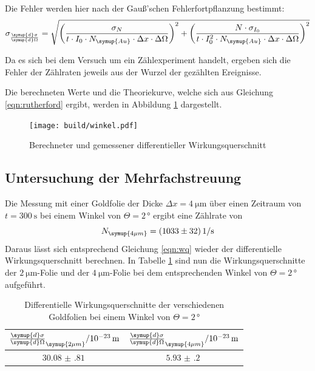 Die Fehler werden hier nach der Gauß'schen Fehlerfortpflanzung bestimmt:
\begin{equation*}
  \sigma_{\frac{\symup{d}\sigma}{\symup{d}\Omega}} = \sqrt{\left(\frac{\sigma_N}{t \cdot I_0 \cdot N_\symup{Au} \cdot \Delta x \cdot \Delta \Omega}\right)^2
  + \left(\frac{N \cdot \sigma_{I_0}}{t \cdot I_0^2 \cdot N_\symup{Au} \cdot \Delta x \cdot \Delta \Omega}\right)^2}
\end{equation*}

Da es sich bei dem Versuch um ein Zählexperiment handelt, ergeben sich die Fehler der Zählraten jeweils aus der Wurzel der gezählten Ereignisse.

Die berechneten Werte und die Theoriekurve, welche sich aus Gleichung \ref{eqn:rutherford} ergibt, werden in Abbildung \ref{fig:wirkungsquerschnitt} dargestellt.

\begin{figure}[H]
  \centering
  \texttt{[image: build/winkel.pdf]}
  \caption{Berechneter und gemessener differentieller Wirkungsquerschnitt}
  \label{fig:wirkungsquerschnitt}
\end{figure}


\subsection{Untersuchung der Mehrfachstreuung}
Die Messung mit einer Goldfolie der Dicke $\Delta x = \SI{4}{\micro\meter}$ über einen
Zeitraum von $t = \SI{300}{\second}$ bei einem Winkel von $\Theta = 2 \, °$ ergibt
eine Zählrate von
\begin{equation*}
  N_\symup{4\mu m} = \SI{1033(32)}{1\per\second}
\end{equation*}
Daraus lässt sich entsprechend Gleichung \ref{eqn:wq} wieder der differentielle Wirkungsquerschnitt
berechnen. In Tabelle \ref{tab:wq} sind nun die Wirkungsquerschnitte der $\SI{2}{\micro\meter}$-Folie
und der $\SI{4}{\micro\meter}$-Folie bei dem entsprechenden Winkel von $\Theta = 2 \, °$ aufgeführt.
\begin{table}[H]
  \centering
  \caption{Differentielle Wirkungsquerschnitte der verschiedenen Goldfolien bei einem Winkel von $\Theta = 2 \, °$}
  \label{tab:wq}
  \begin{tabular}{c c}
    \toprule
    $\frac{\symup{d}\sigma}{\symup{d}\Omega}_\symup{2\mu m} /  10^{-23}\, \mathrm{m}$ & $\frac{\symup{d}\sigma}{\symup{d}\Omega}_\symup{4\mu m}/ 10^{-23}\, \mathrm{m}$ \\
    \midrule
    $\SI{30.08(81)}{}$ & $\SI{5.93(20)}{}$  \\
    \bottomrule
  \end{tabular}
\end{table}


